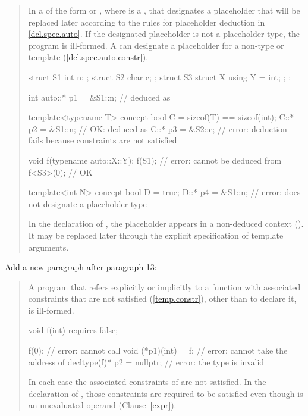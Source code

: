 \begin{quote}
\setcounter{Paras}{11}
\pnum
In a  of the form  or
, where  is a ,
that  designates a placeholder that 
will be replaced later according to the rules for placeholder deduction in
\ref{dcl.spec.auto}.
%
If the designated placeholder is not a placeholder type, the program is
ill-formed.
% 
% 
\enternote
A  can designate a placeholder for
a non-type or template (\ref{dcl.spec.auto.constr}).
\exitnote
% 
\enterexample
\begin{codeblock}
struct S1 { int n; };
struct S2 { char c; };
struct S3 { struct X { using Y = int; }; };

int auto::* p1 = &S1::n; //  deduced as 

template<typename T> concept bool C = sizeof(T) == sizeof(int);
C::* p2 = &S1::n; // OK:  deduced as 
C::* p3 = &S2::c; // error: deduction fails because constraints are not satisfied

void f(typename auto::X::Y);
f(S1);    // error:  cannot be deduced from 
f<S3>(0); // OK

template<int N> concept bool D = true;
D::* p4 = &S1::n; // error:  does not designate a placeholder type
\end{codeblock}
In the declaration of , the placeholder appears in a non-deduced 
context (). It may be replaced later through the
explicit specification of template arguments.
\exitexample
\end{quote}

Add a new paragraph after paragraph 13:

\begin{quote}
\setcounter{Paras}{13}
\pnum
A program that refers explicitly or implicitly to a function with associated 
constraints that are not satisfied (\ref{temp.constr}), other than to declare 
it, is ill-formed.
% 
\enterexample
\begin{codeblock}
void f(int) requires false;

f(0);                      // error: cannot call 
void (*p1)(int) = f;       // error: cannot take the address of 
decltype(f)* p2 = nullptr; // error: the type  is invalid
\end{codeblock}
In each case the associated constraints of  are not satisfied. In the 
declaration of , those constraints are required to be satisfied even 
though  is an unevaluated operand (Clause~\ref{expr}).
\exitexample
\end{quote}


